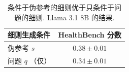 \begin{longtable}{lc}
\caption{条件于伪参考的细则优于只条件于问题的细则. Llama 3.1 8B 的结果.}\label{cat-tab:sqrubric}\\

        \toprule
        \textbf{细则生成条件} & \textbf{HealthBench 分数} \\
        \midrule
        伪参考 $s$ & $0.38 \pm 0.01$ \\
        问题 $q$ （仅） & $0.34 \pm 0.01$ \\
        \bottomrule
    
\end{longtable}
